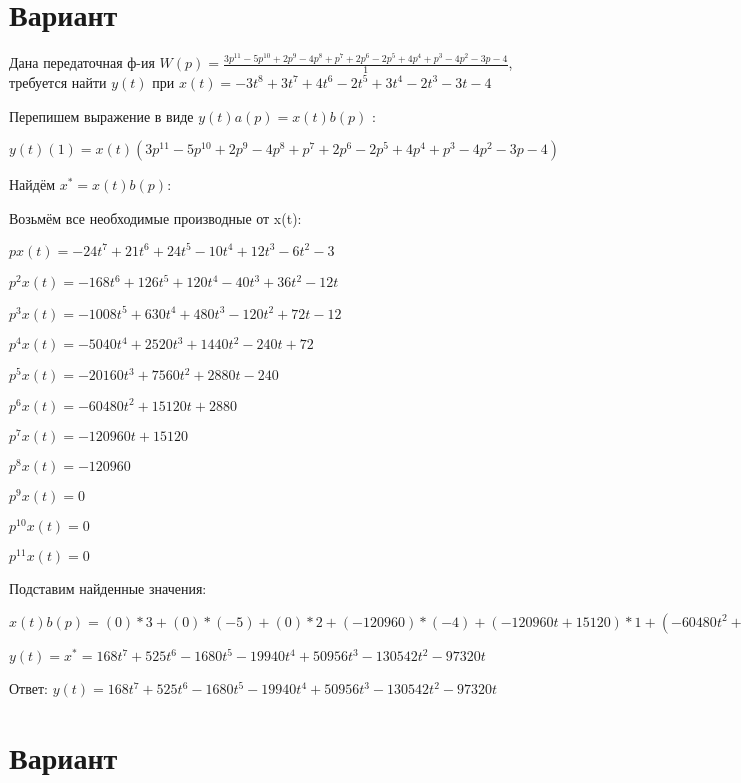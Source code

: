 \documentclass{article}
\begin{document}
{{{{{\section{Вариант}

Дана передаточная ф-ия $W(p)=\frac{3p^{11}-5p^{10}+2p^{9}-4p^{8}+p^{7}+2p^{6}-2p^{5}+4p^{4}+p^{3}-4p^{2}-3p-4}{1}$, требуется найти $y(t)$ при $x(t)=-3t^{8}+3t^{7}+4t^{6}-2t^{5}+3t^{4}-2t^{3}-3t-4$

Перепишем выражение в виде $y(t)a(p)=x(t)b(p)$ :

$y(t)(1)=x(t)(3p^{11}-5p^{10}+2p^{9}-4p^{8}+p^{7}+2p^{6}-2p^{5}+4p^{4}+p^{3}-4p^{2}-3p-4)$

Найдём $x^*=x(t)b(p)$:

Возьмём все необходимые производные от x(t):

$px(t)=-24t^{7}+21t^{6}+24t^{5}-10t^{4}+12t^{3}-6t^{2}-3$

$p^2x(t)=-168t^{6}+126t^{5}+120t^{4}-40t^{3}+36t^{2}-12t$

$p^3x(t)=-1008t^{5}+630t^{4}+480t^{3}-120t^{2}+72t-12$

$p^4x(t)=-5040t^{4}+2520t^{3}+1440t^{2}-240t+72$

$p^5x(t)=-20160t^{3}+7560t^{2}+2880t-240$

$p^6x(t)=-60480t^{2}+15120t+2880$

$p^7x(t)=-120960t+15120$

$p^8x(t)=-120960$

$p^9x(t)=0$

$p^10x(t)=0$

$p^11x(t)=0$

Подставим найденные значения:

$x(t)b(p) = (0)*3+(0)*(-5)+(0)*2+(-120960)*(-4)+(-120960t+15120)*1+(-60480t^{2}+15120t+2880)*2+(-20160t^{3}+7560t^{2}+2880t-240)*(-2)+(-5040t^{4}+2520t^{3}+1440t^{2}-240t+72)*4+(-1008t^{5}+630t^{4}+480t^{3}-120t^{2}+72t-12)*1+(-168t^{6}+126t^{5}+120t^{4}-40t^{3}+36t^{2}-12t)*(-4)+(-24t^{7}+21t^{6}+24t^{5}-10t^{4}+12t^{3}-6t^{2}-3)*(-3)+(-24t^{7}+21t^{6}+24t^{5}-10t^{4}+12t^{3}-6t^{2}-3)*(-4)=168t^{7}+525t^{6}-1680t^{5}-19940t^{4}+50956t^{3}-130542t^{2}-97320t$





$y(t)=x^*=168t^{7}+525t^{6}-1680t^{5}-19940t^{4}+50956t^{3}-130542t^{2}-97320t$

Ответ: $y(t) = 168t^{7}+525t^{6}-1680t^{5}-19940t^{4}+50956t^{3}-130542t^{2}-97320t$

\section{Вариант}

}}}}}
\end{document}
